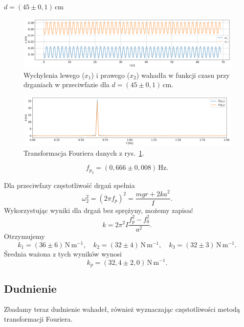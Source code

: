 \documentclass[12pt]{article}
\begin{document}
\(d = (45 \pm 0{,}1)\,\mathrm{cm}\)
\begin{figure}[H]
	\centering
	\includegraphics[width=\linewidth]{counterphase_3}
	\caption{Wychylenia lewego (\(x_1\)) i prawego (\(x_2\)) wahadła w funkcji czasu przy drganiach w przeciwfazie dla \(d = (45 \pm 0{,}1)\,\mathrm{cm}\).}
	\label{fig:counter_phase_2}
\end{figure}
\begin{figure}[H]
	\centering
	\includegraphics[width=\linewidth]{counterphase_3_fft}
	\caption{Transformacja Fouriera danych z rys.~\ref{fig:counter_phase_2}.}
	\label{fig:coutner_phase_2_fft}
\end{figure}
\[
	f_{p_3} = (0{,}666 \pm 0{,}008)\,\mathrm{Hz}.
\]

Dla przeciwfazy częstotliwość drgań spełnia\cite{skrypt}
\[
	\omega_2^2 = (2\pi f_p)^2 = \frac{mgr + 2ka^2}{I}.
\]
Wykorzystując wyniki dla drgań bez sprężyny, możemy zapisać
\[
	k = 2\pi^2 I \frac{f_p^2 - f_0^2}{a^2}.
\]
Otrzymujemy
\[
	k_1 = (36 \pm 6)\,\mathrm{N\,m^{-1}}, \quad
	k_2 = (32 \pm 4)\,\mathrm{N\,m^{-1}}, \quad
	k_3 = (32 \pm 3)\,\mathrm{N\,m^{-1}}.
\]
Średnia ważona z tych wyników wynosi
\[
	k_p = (32{,}4 \pm 2{,}0)\,\mathrm{N\,m^{-1}}.
\]

\subsection{Dudnienie}
Zbadamy teraz dudnienie wahadeł, również wyznaczając częstotliwości metodą transformacji Fouriera.
\end{document}
